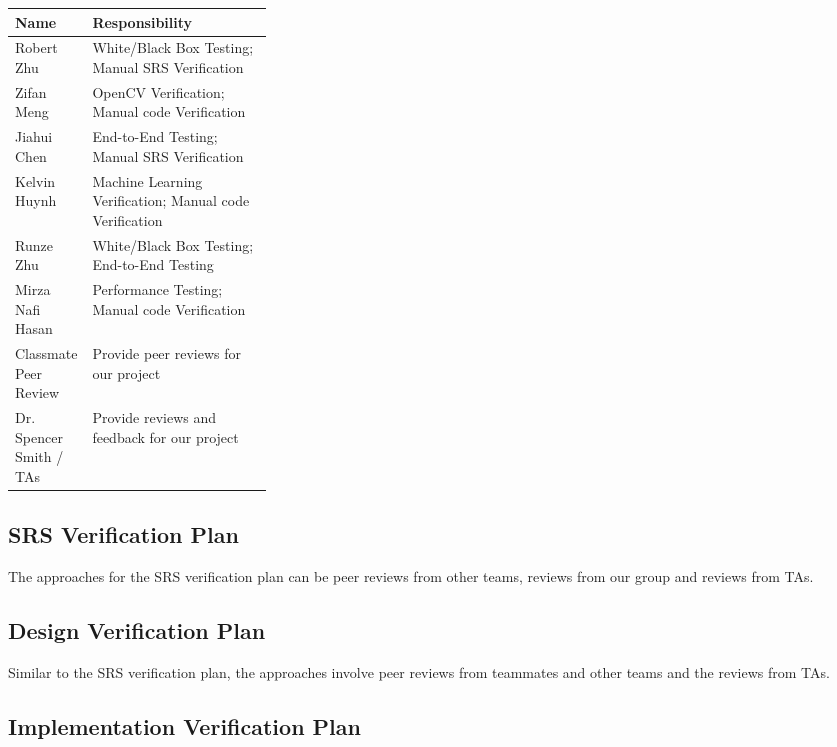 \documentclass[12pt]{article}
\begin{document}
\renewcommand{\arraystretch}{1.2}
\noindent \begin{tabularx}{\textwidth}{p{0.3\linewidth}|X}
\toprule
\textbf{Name} & \textbf{Responsibility}\\
\midrule
Robert Zhu
& White/Black Box Testing; Manual SRS Verification\\ \hline
Zifan Meng
& OpenCV Verification; Manual code Verification\\ \hline
Jiahui Chen
& End-to-End Testing; Manual SRS Verification\\ \hline
Kelvin Huynh
& Machine Learning Verification; Manual code Verification\\ \hline
Runze Zhu
& White/Black Box Testing; End-to-End Testing\\ \hline
Mirza Nafi Hasan
& Performance Testing; Manual code Verification\\ \hline
Classmate Peer Review
& Provide peer reviews for our project\\ \hline
Dr. Spencer Smith / TAs
& Provide reviews and feedback for our project\\
\bottomrule
\end{tabularx}

\subsection{SRS Verification Plan}
The approaches for the SRS verification plan can be peer reviews from other teams, reviews from our group and reviews from TAs.


\subsection{Design Verification Plan}
Similar to the SRS verification plan, the approaches involve peer reviews from teammates and other teams and the reviews from TAs.


\subsection{Implementation Verification Plan}


\end{document}
